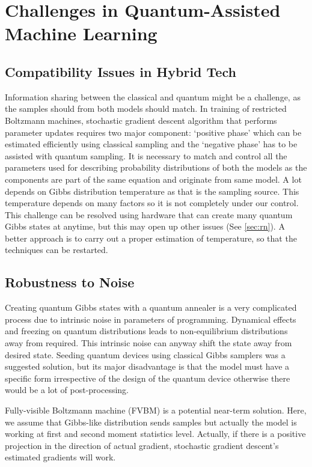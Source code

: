 \section{Challenges in Quantum-Assisted Machine Learning}
\subsection{Compatibility Issues in Hybrid Tech}
Information sharing between the classical and quantum might be a challenge, as the samples should from both models should match. In training of restricted Boltzmann machines,  stochastic gradient descent algorithm that performs parameter updates requires two major	component: `positive phase' which can be estimated efficiently using classical sampling and the `negative phase' has to be assisted with quantum sampling. It is necessary to match and control all the parameters used for describing probability distributions of both the models as the components  are part of the same equation and originate from same model.
A lot depends on  Gibbs distribution temperature as that is the sampling source. This temperature depends on many factors so it is not completely under our control. This challenge can be resolved using hardware that can create many quantum Gibbs states at anytime, but this may open up other issues (See \ref{sec:rn}). A better approach is to carry out a proper estimation of temperature, so that the techniques can be restarted.
\subsection{ Robustness to Noise}{\label{sec:rn}}
Creating  quantum Gibbs states with a quantum annealer is a very complicated process due to intrinsic noise in parameters of programming. Dynamical effects and freezing on quantum distributions leads to non-equilibrium distributions away from required. This intrinsic noise can anyway shift the state away from desired state. Seeding quantum devices using  classical Gibbs samplers was a suggested solution, but its major disadvantage is that the model must have a specific form irrespective of the design of the quantum device otherwise there would be a lot of post-processing.

Fully-visible Boltzmann machine (FVBM) is a potential near-term solution. Here, we assume that Gibbs-like distribution sends samples but actually the model is working at first and second moment statistics level. Actually, if there is a  positive projection in the direction of actual gradient, stochastic gradient descent's  estimated gradients will work.


